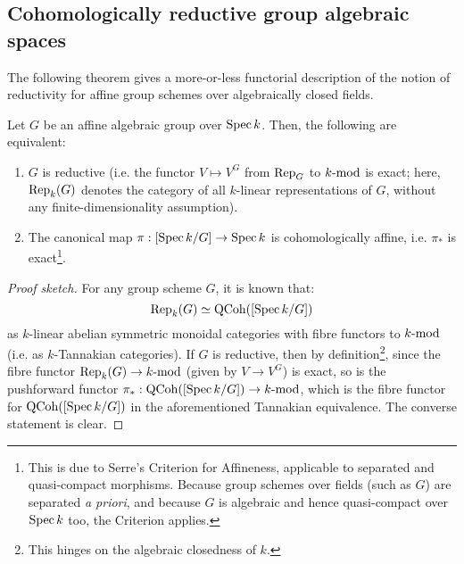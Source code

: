         \subsection{Cohomologically reductive group algebraic spaces}
            The following theorem gives a more-or-less functorial description of the notion of reductivity for affine group schemes over algebraically closed fields.
            \begin{theorem}
                Let $G$ be an affine algebraic group over $\Spec k$. Then, the following are equivalent:
                \begin{enumerate}
                    \item $G$ is reductive (i.e. the functor $V \mapsto V^G$ from $\Rep_G$ to $k\mod$ is exact; here, $\Rep_k(G)$ denotes the category of all $k$-linear representations of $G$, without any finite-dimensionality assumption).
                    \item The canonical map $\pi: [\Spec k/G] \to \Spec k$ is cohomologically affine, i.e. $\pi_*$ is exact\footnote{This is due to Serre's Criterion for Affineness, applicable to separated and quasi-compact morphisms. Because group schemes over fields (such as $G$) are separated \textit{a priori}, and because $G$ is algebraic and hence quasi-compact over $\Spec k$ too, the Criterion applies.}.
                \end{enumerate}
            \end{theorem}
                \begin{proof}[Proof sketch]
                    For any group scheme $G$, it is known that:
                        $$\Rep_k(G) \cong \QCoh([\Spec k/G])$$
                    as $k$-linear abelian symmetric monoidal categories with fibre functors to $k\mod$ (i.e. as $k$-Tannakian categories). If $G$ is reductive, then by definition\footnote{This hinges on the algebraic closedness of $k$.}, since the fibre functor $\Rep_k(G) \to k\mod$ (given by $V \to V^G$) is exact, so is the pushforward functor $\pi_*: \QCoh([\Spec k/G]) \to k\mod$, which is the fibre functor for $\QCoh([\Spec k/G])$ in the aforementioned Tannakian equivalence. The converse statement is clear. 
                \end{proof}
